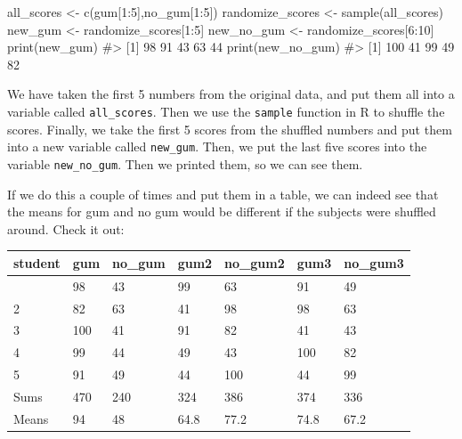 \documentclass[
  letterpaper,
  DIV=11,
  numbers=noendperiod]{scrreprt}
\newenvironment{Shaded}{\begin{snugshade}}{\end{snugshade}}
\newcommand{\CommentTok}[1]{\textcolor[rgb]{0.37,0.37,0.37}{#1}}
\newcommand{\DecValTok}[1]{\textcolor[rgb]{0.68,0.00,0.00}{#1}}
\newcommand{\FunctionTok}[1]{\textcolor[rgb]{0.28,0.35,0.67}{#1}}
\newcommand{\NormalTok}[1]{\textcolor[rgb]{0.00,0.23,0.31}{#1}}
\newcommand{\OtherTok}[1]{\textcolor[rgb]{0.00,0.23,0.31}{#1}}
\newcommand{\SpecialCharTok}[1]{\textcolor[rgb]{0.37,0.37,0.37}{#1}}
\begin{document}
\begin{Shaded}
\begin{Highlighting}[]
\NormalTok{all\_scores       }\OtherTok{\textless{}{-}} \FunctionTok{c}\NormalTok{(gum[}\DecValTok{1}\SpecialCharTok{:}\DecValTok{5}\NormalTok{],no\_gum[}\DecValTok{1}\SpecialCharTok{:}\DecValTok{5}\NormalTok{])}
\NormalTok{randomize\_scores }\OtherTok{\textless{}{-}} \FunctionTok{sample}\NormalTok{(all\_scores)}
\NormalTok{new\_gum          }\OtherTok{\textless{}{-}}\NormalTok{ randomize\_scores[}\DecValTok{1}\SpecialCharTok{:}\DecValTok{5}\NormalTok{]}
\NormalTok{new\_no\_gum       }\OtherTok{\textless{}{-}}\NormalTok{ randomize\_scores[}\DecValTok{6}\SpecialCharTok{:}\DecValTok{10}\NormalTok{]}
\FunctionTok{print}\NormalTok{(new\_gum)}
\CommentTok{\#\textgreater{} [1] 98 91 43 63 44}
\FunctionTok{print}\NormalTok{(new\_no\_gum)}
\CommentTok{\#\textgreater{} [1] 100  41  99  49  82}
\end{Highlighting}
\end{Shaded}

We have taken the first 5 numbers from the original data, and put them
all into a variable called \texttt{all\_scores}. Then we use the
\texttt{sample} function in R to shuffle the scores. Finally, we take
the first 5 scores from the shuffled numbers and put them into a new
variable called \texttt{new\_gum}. Then, we put the last five scores
into the variable \texttt{new\_no\_gum}. Then we printed them, so we can
see them.

If we do this a couple of times and put them in a table, we can indeed
see that the means for gum and no gum would be different if the subjects
were shuffled around. Check it out:

\begin{longtable}[]{@{}lllllll@{}}
\toprule\noalign{}
student & gum & no\_gum & gum2 & no\_gum2 & gum3 & no\_gum3 \\
\midrule\noalign{}
\endhead
\bottomrule\noalign{}
\endlastfoot
1 & 98 & 43 & 99 & 63 & 91 & 49 \\
2 & 82 & 63 & 41 & 98 & 98 & 63 \\
3 & 100 & 41 & 91 & 82 & 41 & 43 \\
4 & 99 & 44 & 49 & 43 & 100 & 82 \\
5 & 91 & 49 & 44 & 100 & 44 & 99 \\
Sums & 470 & 240 & 324 & 386 & 374 & 336 \\
Means & 94 & 48 & 64.8 & 77.2 & 74.8 & 67.2 \\
\end{longtable}
\end{document}
